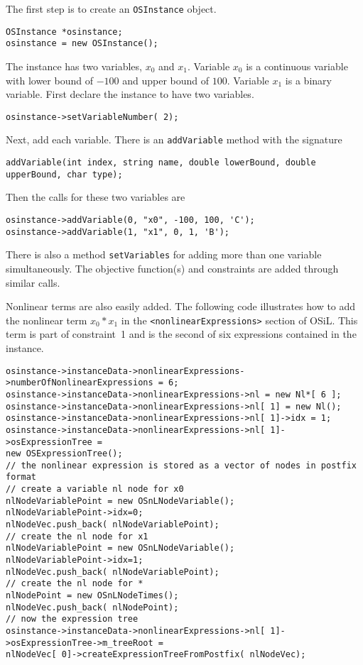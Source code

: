 The first step is to create an {\tt OSInstance} object.
\begin{verbatim}
OSInstance *osinstance;
osinstance = new OSInstance();
\end{verbatim}

The instance has two variables, $x_{0}$ and $x_{1}$. Variable $x_{0}$ is a continuous variable with lower bound of $-100$ and upper bound of $100$. Variable $x_{1}$ is a binary variable. First declare the instance to have two variables.
\begin{verbatim}
osinstance->setVariableNumber( 2);
\end{verbatim}
Next, add each variable. There is an {\tt addVariable} method with the signature
\begin{verbatim}
addVariable(int index, string name, double lowerBound, double upperBound, char type);
\end{verbatim}
Then the calls for these two variables are
\begin{verbatim}
osinstance->addVariable(0, "x0", -100, 100, 'C');
osinstance->addVariable(1, "x1", 0, 1, 'B');
\end{verbatim}
There is also a method {\tt setVariables} for adding more than one variable simultaneously.  The objective function(s) and constraints are added through similar calls.

Nonlinear terms are also easily added.  The following code illustrates how to add the nonlinear term
$x_{0}*x_{1}$ in the {\tt <nonlinearExpressions>} section of  OSiL. This term is part of constraint~1
and is the second of six expressions contained in the instance.
\begin{verbatim}
osinstance->instanceData->nonlinearExpressions->numberOfNonlinearExpressions = 6;
osinstance->instanceData->nonlinearExpressions->nl = new Nl*[ 6 ];
osinstance->instanceData->nonlinearExpressions->nl[ 1] = new Nl();
osinstance->instanceData->nonlinearExpressions->nl[ 1]->idx = 1;
osinstance->instanceData->nonlinearExpressions->nl[ 1]->osExpressionTree =
new OSExpressionTree();
// the nonlinear expression is stored as a vector of nodes in postfix format
// create a variable nl node for x0
nlNodeVariablePoint = new OSnLNodeVariable();
nlNodeVariablePoint->idx=0;
nlNodeVec.push_back( nlNodeVariablePoint);
// create the nl node for x1
nlNodeVariablePoint = new OSnLNodeVariable();
nlNodeVariablePoint->idx=1;
nlNodeVec.push_back( nlNodeVariablePoint);
// create the nl node for *
nlNodePoint = new OSnLNodeTimes();
nlNodeVec.push_back( nlNodePoint);
// now the expression tree
osinstance->instanceData->nonlinearExpressions->nl[ 1]->osExpressionTree->m_treeRoot =
nlNodeVec[ 0]->createExpressionTreeFromPostfix( nlNodeVec);
\end{verbatim}

